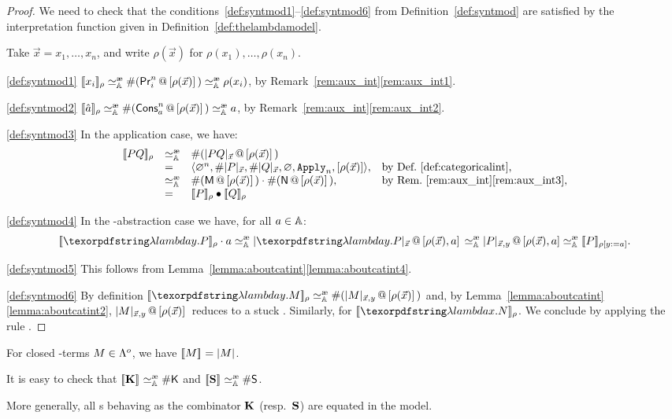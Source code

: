\begin{proof} We need to check that the conditions~\ref{def:syntmod1}--\ref{def:syntmod6} from Definition~\ref{def:syntmod} are satisfied by the interpretation function given in Definition~\ref{def:thelambdamodel}.

Take $\vec x = x_1,\dots,x_n$, and write $\rho(\vec x)$ for $\rho(x_1),\dots,\rho(x_n)$.

\ref{def:syntmod1} $\Int{x_i}{\rho} \simea \Lookup(\append{\mach{Pr}_i^n}{\rho(\vec x)})\simea \rho(x_i)$, by Remark~\ref{rem:aux_int}\ref{rem:aux_int1}. %

\ref{def:syntmod2} $\Int{\cons a}{\rho} \simea \Lookup(\append{\mach{Cons}_a^n}{\rho(\vec x)})\simea a$, by Remark~\ref{rem:aux_int}\ref{rem:aux_int2}. %

\ref{def:syntmod3} In the application case, we have: %
\[
	\begin{array}{llll}
	\Int{PQ}{\rho} &\simea&\Lookup(\append{\CInt{PQ}}{\rho(\vec x)})\\
	&=& \tuple{\Null^{n},\Lookup \CInt[\vec x]{P},\Lookup \CInt[\vec x]{Q},\Null,\ins{Apply}_n,[\rho(\vec x)]},&\textrm{by Def.~\ref{def:categoricalint},}\\
	&\simea&\App{\Lookup(\append{\mM}{\rho(\vec x)})}{\Lookup(\append{\mN}{\rho(\vec x)})},&\textrm{by Rem.~\ref{rem:aux_int}\ref{rem:aux_int3},}\\
	&=&\Int{P}{\rho}\bullet \Int{Q}{\rho}
	\end{array}
\]

\ref{def:syntmod4} In the \lam-abstraction case we have, for all $a\in\Addrs$: %
\[
	\App{\Int{\lam y.P}{\rho}}{a} \simea \append{\CInt{\lam y.P}}{\rho(\vec x),a}
  	 \simea \append{\CInt[\vec x,y]{P}}{\rho(\vec x),a}\\
	 \simea\Int{P}{\rho\repl{y}{a}}.
\]

\ref{def:syntmod5} This follows from Lemma~\ref{lemma:aboutcatint}\ref{lemma:aboutcatint4}. %

\ref{def:syntmod6} By definition $\Int{\lam y.M}{\rho} \simea \Lookup(\append{\CInt[\vec x,y]{M}}{\rho(\vec x)})$ and, by Lemma~\ref{lemma:aboutcatint}\ref{lemma:aboutcatint2}, $\append{\CInt[\vec x,y]{M}}{\rho(\vec x)}$ reduces to a stuck \am. %
Similarly, for $\Int{\lam x.N}{\rho}$. We conclude by applying the rule \extrule.
\end{proof}

\begin{rem}
\bsub
\item For closed \lam-terms $M\in\Lamo$, we have $\Int{M}{} = \CInt[]{M}$.
\item It is easy to check that $\Int{\comb{K}}{}\simea\Lookup\mach{K}$ and
$\Int{\comb{S}}{}\simea\Lookup\mach{S}$.
\item More generally, all \am s behaving as the combinator $\comb{K}$ (resp.\ $\comb{S}$) are equated in the model.
\esub
\end{rem}

